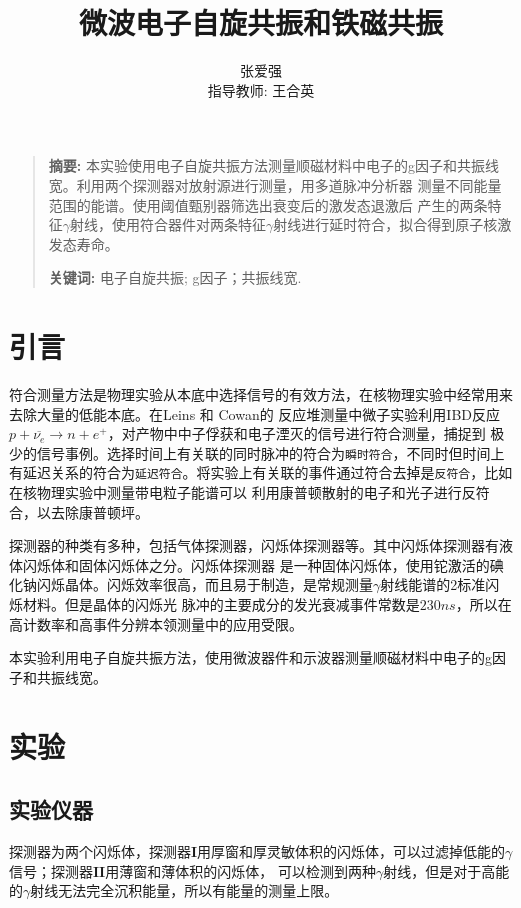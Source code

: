 \documentclass[12pt]{ctexart}
\title{微波电子自旋共振和铁磁共振}
\author{张爱强\\指导教师: 王合英}
\date{}
\newenvironment{sciabstract}{%
\begin{quote} \textbf{摘要: }}
{\end{quote}}
\begin{document}
\maketitle
\begin{sciabstract}
    本实验使用电子自旋共振方法测量顺磁材料中电子的g因子和共振线宽。利用两个探测器对放射源进行测量，用多道脉冲分析器
    测量不同能量范围的能谱。使用阈值甄别器筛选出衰变后的激发态退激后
    产生的两条特征$\gamma$射线，使用符合器件对两条特征$\gamma$射线进行延时符合，拟合得到原子核激发态寿命。
    \par\textbf{关键词: } 电子自旋共振; g因子；共振线宽.
\end{sciabstract}
\section{引言}
符合测量方法是物理实验从本底中选择信号的有效方法，在核物理实验中经常用来去除大量的低能本底。在Leins 和 Cowan的
反应堆测量中微子实验利用IBD反应$p+\overline{\nu_e}\to n+e^+$，对产物中中子俘获和电子湮灭的信号进行符合测量，捕捉到
极少的信号事例\cite{doi:10.1063/1.1770939}。选择时间上有关联的同时脉冲的符合为\texttt{瞬时符合}，不同时但时间上
有延迟关系的符合为\texttt{延迟符合}。将实验上有关联的事件通过符合去掉是\texttt{反符合}，比如在核物理实验中测量带电粒子能谱可以
利用康普顿散射的电子和光子进行反符合，以去除康普顿坪\cite{nuclear}。

探测器的种类有多种，包括气体探测器，闪烁体探测器等\cite{nuclear}。其中闪烁体探测器有液体闪烁体和固体闪烁体之分。闪烁体探测器
是一种固体闪烁体，使用铊激活的碘化钠闪烁晶体。闪烁效率很高，而且易于制造，是常规测量$\gamma$射线能谱的2标准闪烁材料。但是晶体的闪烁光
脉冲的主要成分的发光衰减事件常数是$230ns$，所以在高计数率和高事件分辨本领测量中的应用受限。

本实验利用电子自旋共振方法，使用微波器件和示波器测量顺磁材料中电子的g因子和共振线宽。
\section{实验}
\subsection{实验仪器}
探测器为两个闪烁体，探测器$\mathbf{I}$用厚窗和厚灵敏体积的闪烁体，可以过滤掉低能的$\gamma$信号；探测器$\mathbf{II}$用薄窗和薄体积的闪烁体，
可以检测到两种$\gamma$射线，但是对于高能的$\gamma$射线无法完全沉积能量，所以有能量的测量上限。
\end{document}
